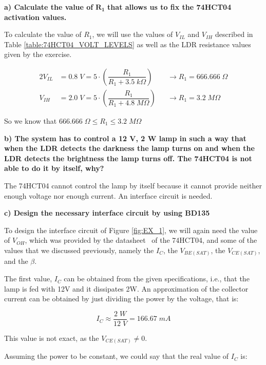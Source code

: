 \textbf{a) Calculate the value of} $\mathbf{R_1}$ \textbf{that allows us to fix the 74HCT04 activation values.}\medskip

To calculate the value of $R_1$, we will use the values of $V_{IL}$ and $V_{IH}$ described in Table \ref{table:74HCT04_VOLT_LEVELS} as well as the LDR resistance values given by the exercise.\medskip

\vspace{-0.5cm}

\begin{alignat*}{2}
    V_{IL} &= 0.8 \; V = 5 \cdot \left( \dfrac{R_1}{R_1 + 3.5 \; k\Omega} \right)  &&\rightarrow R_1 = 666.666 \; \Omega \\[7pt]
    V_{IH} &= 2.0 \; V = 5 \cdot \left( \dfrac{R_1}{R_1 + 4.8 \; M\Omega} \right)  &&\rightarrow R_1 = 3.2  \; M\Omega
\end{alignat*}

So we know that $ 666.666 \; \Omega \leq R_1 \leq 3.2 \; M\Omega$ \bigskip

\textbf{b) The system has to control a 12 V, 2 W lamp in such a way that when the LDR detects the darkness the lamp turns on and when the LDR detects the brightness the lamp turns off. The 74HCT04 is not able to do it by itself, why?}\medskip

The 74HCT04 cannot control the lamp by itself because it cannot provide neither enough voltage nor enough current. An interface circuit is needed. \bigskip

\textbf{c) Design the necessary interface circuit by using BD135}\medskip

To design the interface circuit of Figure \ref{fig:EX_1}, we will again need the value of $V_{OH}$, which was provided by the datasheet~\autocite{74HCT04} of the 74HCT04, and some of the values that we discussed previously, namely the $I_C$, the $V_{BE(SAT)}$, the $V_{CE(SAT)}$, and the $\beta$.\medskip

The first value, $I_C$ can be obtained from the given specifications, i.e., that the lamp is fed with 12V and it dissipates 2W. An approximation of the collector current can be obtained by just dividing the power by the voltage, that is:

\begin{equation*}
    I_C \approx \frac{2 \; W}{12 \; V} = 166.67 \; mA
\end{equation*}


This value is not exact, as the $V_{CE(SAT)} \neq 0$.\medskip

Assuming the power to be constant, we could say that the real value of $I_C$ is:

